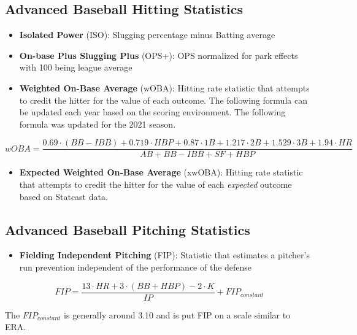 \documentclass[
  11pt,
]{book}
\providecommand{\tightlist}{%
  \setlength{\itemsep}{0pt}\setlength{\parskip}{0pt}}
\theoremstyle{definition}
\theoremstyle{definition}
\theoremstyle{definition}
\theoremstyle{definition}
\theoremstyle{remark}
\begin{document}
\hypertarget{advanced-baseball-hitting-statistics}{%
\subsection{Advanced Baseball Hitting Statistics}\label{advanced-baseball-hitting-statistics}}

\begin{itemize}
\item
  \textbf{Isolated Power} (ISO): Slugging percentage minus Batting average
\item
  \textbf{On-base Plus Slugging Plus} (OPS+): OPS normalized for park effects with 100 being league average
\item
  \textbf{Weighted On-Base Average} (wOBA): Hitting rate statistic that attempts to credit the hitter for the value of each outcome. The following formula can be updated each year based on the scoring environment. The following formula was updated for the 2021 season.
\end{itemize}

\[wOBA = \frac{0.69 \cdot (BB - IBB) + 0.719 \cdot HBP + 0.87 \cdot 1B + 1.217 \cdot 2B + 1.529 \cdot 3B + 1.94 \cdot HR}{AB + BB - IBB + SF + HBP}\]

\begin{itemize}
\tightlist
\item
  \textbf{Expected Weighted On-Base Average} (xwOBA): Hitting rate statistic that attempts to credit the hitter for the value of each \emph{expected} outcome based on Statcast data.
\end{itemize}

\hypertarget{advanced-baseball-pitching-statistics}{%
\subsection{Advanced Baseball Pitching Statistics}\label{advanced-baseball-pitching-statistics}}

\begin{itemize}
\tightlist
\item
  \textbf{Fielding Independent Pitching} (FIP): Statistic that estimates a pitcher's run prevention independent of the performance of the defense
\end{itemize}

\[FIP = \frac{13 \cdot HR + 3 \cdot (BB + HBP) - 2 \cdot K}{IP} + FIP_{constant}\]

The \(FIP_{constant}\) is generally around 3.10 and is put FIP on a scale similar to ERA.
\end{document}
